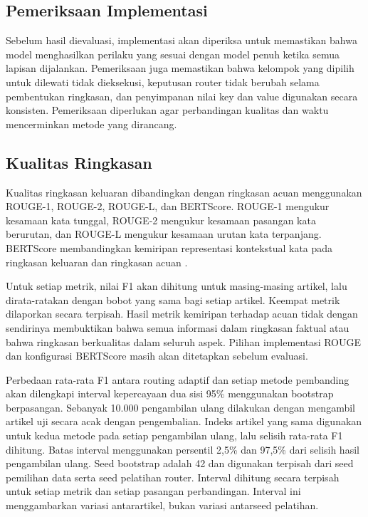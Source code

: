 \subsection{Pemeriksaan Implementasi}

Sebelum hasil dievaluasi, implementasi akan diperiksa untuk memastikan bahwa model menghasilkan perilaku yang sesuai dengan model penuh ketika semua lapisan dijalankan. Pemeriksaan juga memastikan bahwa kelompok yang dipilih untuk dilewati tidak dieksekusi, keputusan router tidak berubah selama pembentukan ringkasan, dan penyimpanan nilai key dan value digunakan secara konsisten. Pemeriksaan diperlukan agar perbandingan kualitas dan waktu mencerminkan metode yang dirancang.

\subsection{Kualitas Ringkasan}

Kualitas ringkasan keluaran dibandingkan dengan ringkasan acuan menggunakan ROUGE-1, ROUGE-2, ROUGE-L, dan BERTScore. ROUGE-1 mengukur kesamaan kata tunggal, ROUGE-2 mengukur kesamaan pasangan kata berurutan, dan ROUGE-L mengukur kesamaan urutan kata terpanjang. BERTScore membandingkan kemiripan representasi kontekstual kata pada ringkasan keluaran dan ringkasan acuan \citep{zhang2020bertscore}.

Untuk setiap metrik, nilai F1 akan dihitung untuk masing-masing artikel, lalu dirata-ratakan dengan bobot yang sama bagi setiap artikel. Keempat metrik dilaporkan secara terpisah. Hasil metrik kemiripan terhadap acuan tidak dengan sendirinya membuktikan bahwa semua informasi dalam ringkasan faktual atau bahwa ringkasan berkualitas dalam seluruh aspek. Pilihan implementasi ROUGE dan konfigurasi BERTScore masih akan ditetapkan sebelum evaluasi.

Perbedaan rata-rata F1 antara routing adaptif dan setiap metode pembanding akan dilengkapi interval kepercayaan dua sisi 95\% menggunakan bootstrap berpasangan. Sebanyak 10.000 pengambilan ulang dilakukan dengan mengambil artikel uji secara acak dengan pengembalian. Indeks artikel yang sama digunakan untuk kedua metode pada setiap pengambilan ulang, lalu selisih rata-rata F1 dihitung. Batas interval menggunakan persentil 2,5\% dan 97,5\% dari selisih hasil pengambilan ulang. Seed bootstrap adalah 42 dan digunakan terpisah dari seed pemilihan data serta seed pelatihan router. Interval dihitung secara terpisah untuk setiap metrik dan setiap pasangan perbandingan. Interval ini menggambarkan variasi antarartikel, bukan variasi antarseed pelatihan.

